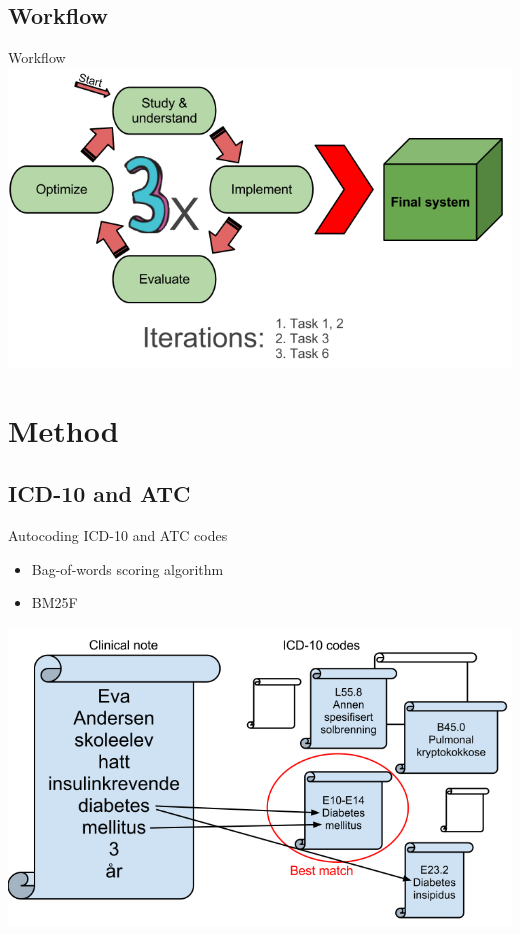 \documentclass[screen, compress]{beamer}
\begin{document}
\subsection{Workflow}
\begin{frame}{Workflow} %
	\includegraphics[width=\textwidth,height=0.9\textheight]{img/summary}
\end{frame}


\section{Method}

\subsection{ICD-10 and ATC}
\begin{frame}{Autocoding ICD-10 and ATC codes} %
\LARGE
\begin{itemize}
	\item Bag-of-words scoring algorithm
	\item BM25F
\end{itemize}
\includegraphics[width=\textwidth,height=0.7\textheight]{img/bagofwords}
\end{frame}
\end{document}
